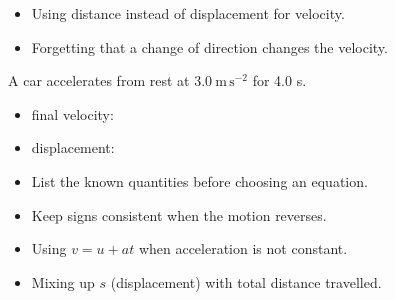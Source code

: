 \documentclass[11pt,a4paper]{article}
\begin{document}
\begin{jtmisconception}
\begin{itemize}[leftmargin=1.05em,itemsep=1pt,topsep=1pt,parsep=0pt]
  \item Using distance instead of displacement for velocity.
  \item Forgetting that a change of direction changes the velocity.
\end{itemize}
\end{jtmisconception}






A car accelerates from rest at $3.0\ \mathrm{m\,s^{-2}}$ for 4.0 s.
\begin{itemize}
  \item final velocity: 
  \item displacement: 
\end{itemize}

\begin{jtexamfocus}
\begin{itemize}[leftmargin=1.05em,itemsep=1pt,topsep=1pt,parsep=0pt]
  \item List the known quantities before choosing an equation.
  \item Keep signs consistent when the motion reverses.
\end{itemize}
\end{jtexamfocus}

\begin{jtmisconception}
\begin{itemize}[leftmargin=1.05em,itemsep=1pt,topsep=1pt,parsep=0pt]
  \item Using $v = u + at$ when acceleration is not constant.
  \item Mixing up $s$ (displacement) with total distance travelled.
\end{itemize}
\end{jtmisconception}
\end{document}
